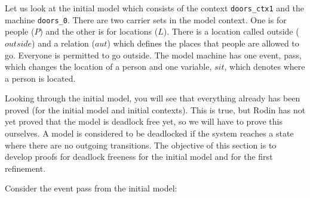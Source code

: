 

Let us look at the initial model which consists of the context \texttt{doors\_ctx1} and the machine \texttt{doors\_0}. There are two carrier sets in the model context. One is for people ($P$) and the other is for locations ($L$). There is a location called outside ($outside$) and a relation ($aut$) which defines the places that people are allowed to go. Everyone is permitted to go outside. The model machine has one event, \textsf{pass}, which changes the location of a person and one variable, $sit$, which denotes where a person is located. 


Looking through the initial model, you will see that everything already has been proved (for the initial model and initial contexts). This is true, but Rodin has not yet proved that the model is deadlock free yet, so we will have to prove this ourselves. A model is considered to be deadlocked if the system reaches a state where there are no outgoing transitions. The objective of this section is to develop proofs for deadlock freeness for the initial model and for the first refinement. 

Consider the event \textsf{pass} from the initial model:


